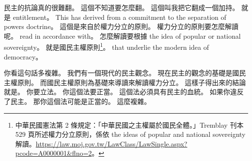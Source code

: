 \hypertarget{w02:cue:1627}{}民主的抗論真的很難翻。
\hypertarget{w02:cue:1628}{}這個不知道要怎麼翻。
\hypertarget{w02:cue:1629}{}這個叫我把它翻成一個加持。
\hypertarget{w02:cue:1630}{}就是 entitlement。
\hypertarget{w02:cue:1631}{}This has derived from a commitment to the separation of powers doctrine。
\hypertarget{w02:cue:1632}{}這個是來自於權力分立的原則。
\hypertarget{w02:cue:1633}{}權力分立的原則要怎麼解讀呢。
\hypertarget{w02:cue:1634}{}read in accordance with。
\hypertarget{w02:cue:1635}{}怎麼解讀要根據 the idea of popular or national sovereignty。
\hypertarget{w02:cue:1636}{}就是國民主權原則\footnote{中華民國憲法第 2 條規定：「中華民國之主權屬於國民全體。」Tremblay 刊本 529 頁所述權力分立原則，係依 the ideas of popular and national sovereignty 解讀。\url{https://law.moj.gov.tw/LawClass/LawSingle.aspx?pcode=A0000001&flno=2}。}。
\hypertarget{w02:cue:1637}{}that underlie the modern idea of democracy。

\hypertarget{w02:cue:1638}{}你看這句話多複雜。
\hypertarget{w02:cue:1639}{}我們有一個現代的民主觀念。
\hypertarget{w02:cue:1640}{}現在民主的觀念的基礎是國民主權原則。
\hypertarget{w02:cue:1641}{}而國民主權原則為基礎來導讀來解讀權力分立。
\hypertarget{w02:cue:1642}{}這樣子得出來的結論就是。
\hypertarget{w02:cue:1643}{}你要立法。
\hypertarget{w02:cue:1644}{}你這個法要正當。
\hypertarget{w02:cue:1645}{}這個法必須具有民主的血統。
\hypertarget{w02:cue:1646}{}如果你違反了民主。
\hypertarget{w02:cue:1647}{}那你這個法可能是正當的。
\hypertarget{w02:cue:1648}{}這麼複雜。

